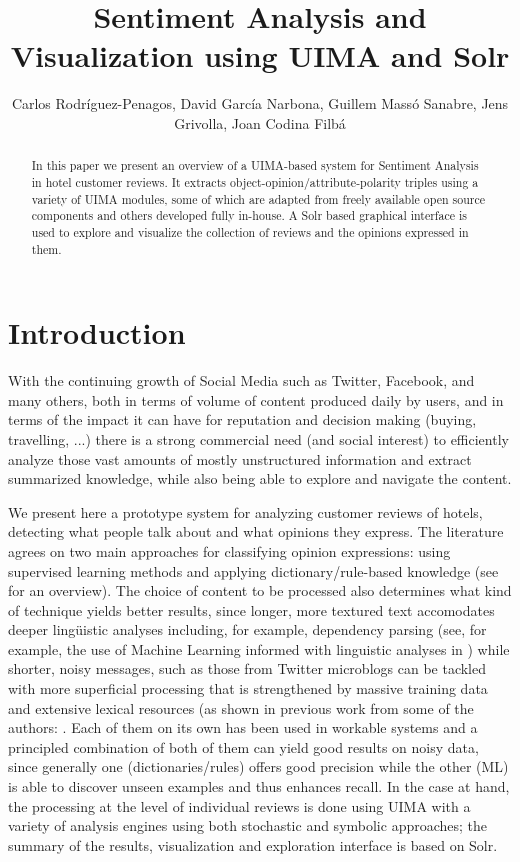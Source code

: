 \documentclass{llncs}
\title{Sentiment Analysis and Visualization using UIMA and Solr}
\author{Carlos Rodríguez-Penagos, David García Narbona, Guillem Massó Sanabre, Jens Grivolla, Joan Codina Filbá}
\institute{Barcelona Media Innovation Centre}
\begin{document}
\maketitle

\begin{abstract}
In this paper we present an overview of a UIMA-based system for Sentiment Analysis in hotel customer reviews. It extracts object-opinion/attribute-polarity triples using a variety of UIMA modules, some of which are adapted from freely available open source components and others developed fully in-house. A Solr based graphical interface is used to explore and visualize the collection of reviews and the opinions expressed in them.
\end{abstract}

\section{Introduction}

With the continuing growth of Social Media such as Twitter, Facebook, and many others, both in terms of volume of content produced daily by users, and in terms of the impact it can have for reputation and decision making (buying, travelling, ...) there is a strong commercial need (and social interest) to efficiently analyze those vast amounts of mostly unstructured information and extract summarized knowledge, while also being able to explore and navigate the content.

We present here a prototype system for analyzing customer reviews of hotels, detecting what people talk about and what opinions they express. The literature agrees on two main approaches for classifying opinion expressions: using supervised learning methods and applying dictionary/rule-based knowledge (see \cite{liu_sentiment_2012} for an overview). The choice of content to be processed also determines what kind of technique yields better results, since longer, more textured text accomodates deeper lingüistic analyses including, for example, dependency parsing (see, for example, the use of Machine Learning informed with linguistic analyses in \cite{wilson_recognizing_2010}) while shorter, noisy messages, such as those from Twitter microblogs can be tackled with more superficial processing that is strengthened by massive training data and extensive lexical resources (as shown in previous work from some of the authors: \cite{rodriguez-penagos_fbm:_2013,chenlo_fbm-yahoo!_2012}. Each of them on its own has been used in workable systems\cite{zhang_combining_2011} and a principled combination of both of them can yield good results on noisy data, since generally one (dictionaries/rules) offers good precision while the other (ML) is able to discover unseen examples and thus enhances recall. In the case at hand, the processing at the level of individual reviews is done using UIMA with a variety of analysis engines using both stochastic and symbolic approaches; the summary of the results, visualization and exploration interface is based on Solr.
\end{document}
